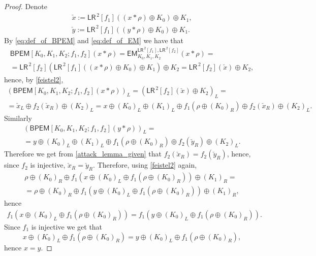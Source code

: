 \documentclass{llncs}
\newcommand{\tx}{\textsf}
\begin{document}
\begin{proof}
Denote
\begin{gather*}
\check{x}:=\tx{LR}^{\,2}[f_1]\left((x*\rho)\oplus K_0\right)\oplus K_1,\\
\check{y}:=\tx{LR}^{\,2}[f_1]\left((y*\rho)\oplus K_0\right)\oplus K_1.
\end{gather*}
By \eqref{eq:def_of_BPEM} and \eqref{eq:def_of_EM} we have that
\begin{gather*}
\tx{BPEM}[K_0,K_1, K_2; f_1, f_2](x*\rho)=
\tx{EM}^{\tx{LR}^{\,2}[f_1],\tx{LR}^{\,2}[f_2]}_{K_0, K_1, K_2}(x*\rho)=\\
=\tx{LR}^{\,2}[f_2]\left(\tx{LR}^{\,2}[f_1]((x*\rho)\oplus K_0)\oplus K_1\right)\oplus K_2=\tx{LR}^{\,2}[f_2]\left(\check{x}\right)\oplus K_2,
\end{gather*}
hence, by \eqref{feistel2},
\begin{gather*}
\left(\tx{BPEM}[K_0,K_1, K_2; f_1, f_2](x*\rho)\right)_L
=\left(\tx{LR}^{\,2}[f_2]\left(\check{x}\right)\oplus K_2\right)_L=\\
=\check{x}_L\oplus f_2\left(\check{x}_R\right)\oplus(K_2)_L=x\oplus(K_0)_L\oplus (K_1)_L\oplus f_1\left(\rho\oplus(K_0)_R\right)\oplus f_2\left(\check{x}_R\right)\oplus(K_2)_L.
\end{gather*}
Similarly
\begin{gather*}\left(\tx{BPEM}[K_0,K_1, K_2; f_1, f_2](y*\rho)\right)_L=\\
=y\oplus(K_0)_L\oplus (K_1)_L\oplus f_1\left(\rho\oplus(K_0)_R\right)\oplus f_2\left(\check{y}_R\right)\oplus(K_2)_L.
\end{gather*}
Therefore we get from \eqref{attack_lemma_given} that $ f_2\left(\check{x}_R\right)= f_2\left(\check{y}_R\right)$, hence, since $f_2$ is injective, $\check{x}_R=\check{y}_R$. Therefore, using \eqref{feistel2} again,
\begin{gather*}
\rho\oplus(K_0)_R\oplus f_1\left(x\oplus(K_0)_L\oplus f_1(\rho\oplus(K_0)_R)\right)\oplus (K_1)_R=\\
=\rho\oplus(K_0)_R\oplus f_1\left(y\oplus(K_0)_L\oplus f_1(\rho\oplus(K_0)_R)\right)\oplus (K_1)_R,
\end{gather*}
hence
\begin{gather*}
f_1\left(x\oplus(K_0)_L\oplus f_1(\rho\oplus(K_0)_R)\right)=f_1\left(y\oplus(K_0)_L\oplus f_1(\rho\oplus(K_0)_R)\right).
\end{gather*}
Since $f_1$ is injective we get that
$$x\oplus(K_0)_L\oplus f_1(\rho\oplus(K_0)_R)=y\oplus(K_0)_L\oplus f_1(\rho\oplus(K_0)_R),$$
hence $x=y$.
\end{proof}
\end{document}
